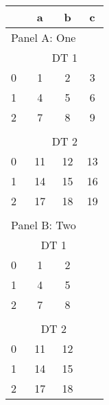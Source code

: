 \begin{table}
\centering
\begin{threeparttable}
\caption{}
\begin{tabular}{lccc}
\toprule
  & a & b & c\\
\midrule
\multicolumn{4}{l}{Panel A: One}\\
  & \multicolumn{3}{c}{DT 1}\\
\cmidrule(lr){2-4}
0 & 1 & 2 & 3 \\
1 & 4 & 5 & 6 \\
2 & 7 & 8 & 9 \\
  &   &   &  \\
  & \multicolumn{3}{c}{DT 2}\\
\cmidrule(lr){2-4}
0 & 11 & 12 & 13 \\
1 & 14 & 15 & 16 \\
2 & 17 & 18 & 19 \\
  &   &   &  \\
\multicolumn{3}{l}{Panel B: Two}\\
  & \multicolumn{2}{c}{DT 1} &  \\
\cmidrule(lr){2-3}
0 & 1 & 2  &  \\
1 & 4 & 5  &  \\
2 & 7 & 8  &  \\
  &   &   &  \\
  & \multicolumn{2}{c}{DT 2} &  \\
\cmidrule(lr){2-3}
0 & 11 & 12  &  \\
1 & 14 & 15  &  \\
2 & 17 & 18  &  \\
\bottomrule

\end{tabular}
\end{threeparttable}
\end{table}